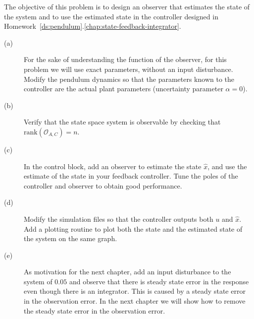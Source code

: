 
The objective of this problem is to design an observer that estimates the state of the system and to use the estimated state in the controller designed in Homework~\ref{ds:pendulum}.\ref{chap:state-feedback-integrator}.
\begin{description}\item[]
\item[(a)] For the sake of understanding the function of the observer, for this problem we will use exact parameters, without an input disturbance.  Modify the pendulum dynamics so that the parameters known to the controller are the actual plant parameters (uncertainty parameter $\alpha=0$).
\item[(b)] Verify that the state space system is observable by checking that $\text{rank}(\mathcal{O}_{A,C})=n$.
\item[(c)] In the control block, add an observer to estimate the state $\hat{x}$, and use the estimate of the state in your feedback controller. Tune the poles of the controller and observer to obtain good performance.  
\item[(d)] Modify the simulation files so that the controller outputs both $u$ and $\hat{x}$.  Add a plotting routine to plot both the state and the estimated state of the system on the same graph.
\item[(e)] As motivation for the next chapter, add an input disturbance to the system of $0.05$ and observe that there is steady state error in the response even though there is an integrator.  This is caused by a steady state error in the observation error.  In the next chapter we will show how to remove the steady state error in the observation error.
\end{description}
